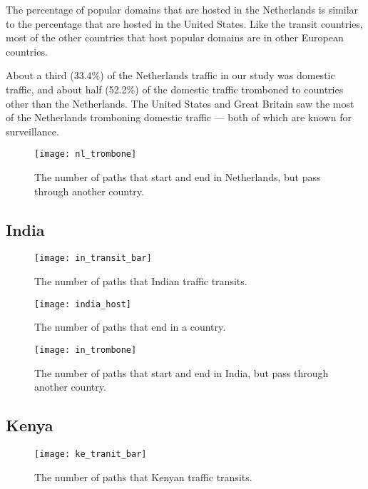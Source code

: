 The percentage of popular domains that are hosted in the Netherlands is similar to the percentage that are hosted in the United States.  Like the transit countries, most of the other countries that host popular domains are in other European countries.

About a third (33.4\%) of the Netherlands traffic in our study was domestic traffic, and about half (52.2\%) of the domestic traffic tromboned to countries other than the Netherlands.  The United States and Great Britain saw the most of the Netherlands tromboning domestic traffic --- both of which are known for surveillance.

\begin{figure}
\centering
\texttt{[image: nl\_trombone]}
\caption{The number of paths that start and end in Netherlands, but pass through another country.}
\label{fig:trombone_nl}
\end{figure}

\subsection{India}

\begin{figure}
\centering
\texttt{[image: in\_transit\_bar]}
\caption{The number of paths that Indian traffic transits.}
\label{fig:transit_in}
\end{figure}

\begin{figure}[t!]
\centering
\texttt{[image: india\_host]}
\caption{The number of paths that end in a country.}
\label{fig:host_in}
\end{figure} 

\begin{figure}
\centering
\texttt{[image: in\_trombone]}
\caption{The number of paths that start and end in India, but pass through another country.}
\label{fig:trombone_in}
\end{figure}

\subsection{Kenya}

\begin{figure}
\centering
\texttt{[image: ke\_tranit\_bar]}
\caption{The number of paths that Kenyan traffic transits.}
\label{fig:transit_ke}
\end{figure}

